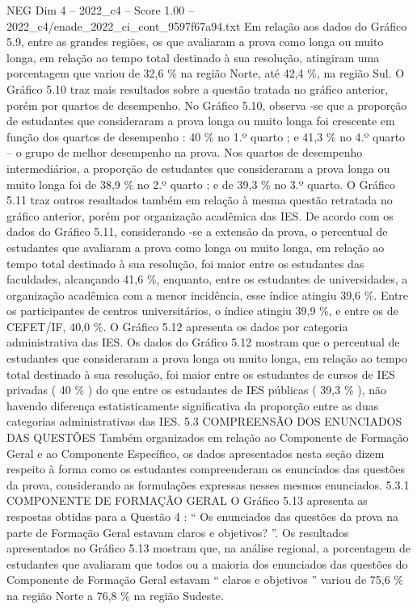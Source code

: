 \begin{textsample}{NEG Dim 4 – 2022\_c4 – Score 1.00 – 2022\_c4/enade\_2022\_ci\_cont\_9597f67a94.txt}
Em relação aos dados do Gráfico 5.9, entre as grandes regiões, os que avaliaram a prova como longa ou muito longa, em relação ao tempo total destinado à sua resolução, atingiram uma porcentagem que variou de 32,6 \% na região Norte, até 42,4 \%, na região Sul.
O Gráfico 5.10 traz mais resultados sobre a questão tratada no gráfico anterior, porém por quartos de desempenho.
No Gráfico 5.10, observa -se que a proporção de estudantes que consideraram a prova longa ou muito longa foi crescente em função dos quartos de desempenho : 40 \% no 1.º quarto ; e 41,3 \% no 4.º quarto – o grupo de melhor desempenho na prova.
Nos quartos de desempenho intermediários, a proporção de estudantes que consideraram a prova longa ou muito longa foi de 38,9 \% no 2.º quarto ; e de 39,3 \% no 3.º quarto.
O Gráfico 5.11 traz outros resultados também em relação à mesma questão retratada no gráfico anterior, porém por organização acadêmica das IES.
De acordo com os dados do Gráfico 5.11, considerando -se a extensão da prova, o percentual de estudantes que avaliaram a prova como longa ou muito longa, em relação ao tempo total destinado à sua resolução, foi maior entre os estudantes das faculdades, alcançando 41,6 \%, enquanto, entre os estudantes de universidades, a organização acadêmica com a menor incidência, esse índice atingiu 39,6 \%.
Entre os participantes de centros universitários, o índice atingiu 39,9 \%, e entre os de CEFET/IF, 40,0 \%.
O Gráfico 5.12 apresenta os dados por categoria administrativa das IES.
Os dados do Gráfico 5.12 mostram que o percentual de estudantes que consideraram a prova longa ou muito longa, em relação ao tempo total destinado à sua resolução, foi maior entre os estudantes de cursos de IES privadas ( 40 \% ) do que entre os estudantes de IES públicas ( 39,3 \% ), não havendo diferença estatisticamente significativa da proporção entre as duas categorias administrativas das IES. 5.3 COMPREENSÃO DOS ENUNCIADOS DAS QUESTÕES Também organizados em relação ao Componente de Formação Geral e ao Componente Específico, os dados apresentados nesta seção dizem respeito à forma como os estudantes compreenderam os enunciados das questões da prova, considerando as formulações expressas nesses mesmos enunciados. 5.3.1 COMPONENTE DE FORMAÇÃO GERAL O Gráfico 5.13 apresenta as respostas obtidas para a Questão 4 : “ Os enunciados das questões da prova na parte de Formação Geral estavam claros e objetivos? ”.
Os resultados apresentados no Gráfico 5.13 mostram que, na análise regional, a porcentagem de estudantes que avaliaram que todos ou a maioria dos enunciados das questões do Componente de Formação Geral estavam “ claros e objetivos ” variou de 75,6 \% na região Norte a 76,8 \% na região Sudeste.

\end{textsample}
